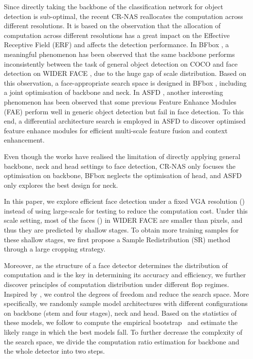 \documentclass[10pt,twocolumn,letterpaper]{article}
\begin{document}
Since directly taking the backbone of the classification network for object detection is sub-optimal, the recent CR-NAS \cite{liang2019computation} reallocates the computation across different resolutions. It is based on the observation that the allocation of computation across different resolutions has a great impact on the Effective Receptive Field (ERF) and affects the detection performance. In BFbox \cite{liu2020bfbox}, a meaningful phenomenon has been observed that the same backbone performs inconsistently between the task of general object detection on COCO \cite{lin2014microsoft} and face detection on WIDER FACE \cite{yang2016wider}, due to the huge gap of scale distribution. Based on this observation, a face-appropriate search space is designed in BFbox \cite{liu2020bfbox}, including a joint optimisation of backbone and neck. In ASFD \cite{zhang2020asfd}, another interesting phenomenon has been observed that some previous Feature Enhance Modules (FAE) perform well in generic object detection but fail in face detection. To this end, a differential architecture search is employed in ASFD \cite{zhang2020asfd} to discover optimised feature enhance modules for efficient multi-scale feature fusion and context enhancement.

Even though the works \cite{liu2020bfbox,zhang2020asfd} have realised the limitation of directly applying general backbone, neck and head settings to face detection, CR-NAS \cite{liang2019computation} only focuses the optimisation on backbone, BFbox \cite{liu2020bfbox} neglects the optimisation of head, and ASFD \cite{zhang2020asfd} only explores the best design for neck.

In this paper, we explore efficient face detection under a fixed VGA resolution (\ie ) instead of using large-scale for testing \cite{zhu2020tinaface} to reduce the computation cost. Under this scale setting, most of the faces () in WIDER FACE are smaller than  pixels, and thus they are predicted by shallow stages. To obtain more training samples for these shallow stages, we first propose a Sample Redistribution (SR) method through a large cropping strategy. 

Moreover, as the structure of a face detector determines the distribution of computation and is the key in determining its accuracy and efficiency, we further discover principles of computation distribution under different flop regimes. Inspired by \cite{radosavovic2020designing}, we control the degrees of freedom and reduce the search space. More specifically, we randomly sample model architectures with different configurations on backbone (stem and four stages), neck and head. Based on the statistics of these models, we follow \cite{radosavovic2020designing} to compute the empirical bootstrap~\cite{Efron1994} and estimate the likely range in which the best models fall. To further decrease the complexity of the search space, we divide the computation ratio estimation for backbone and the whole detector into two steps.
\end{document}
